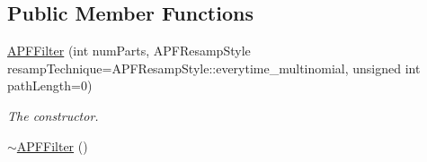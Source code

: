 \subsection*{Public Member Functions}
\begin{DoxyCompactItemize}
\item 
\hyperlink{classAPFFilter_acda2f47653ceda4bfd3d9a25d18790c7}{A\+P\+F\+Filter} (int num\+Parts, A\+P\+F\+Resamp\+Style resamp\+Technique=A\+P\+F\+Resamp\+Style\+::everytime\+\_\+multinomial, unsigned int path\+Length=0)
\begin{DoxyCompactList}\small\item\em The constructor. \end{DoxyCompactList}\item 
\hyperlink{classAPFFilter_ac2f814288c00c8b4f149cb4887d11f92}{$\sim$\+A\+P\+F\+Filter} ()\hypertarget{classAPFFilter_ac2f814288c00c8b4f149cb4887d11f92}{}\label{classAPFFilter_ac2f814288c00c8b4f149cb4887d11f92}


\end{DoxyCompactItemize}
